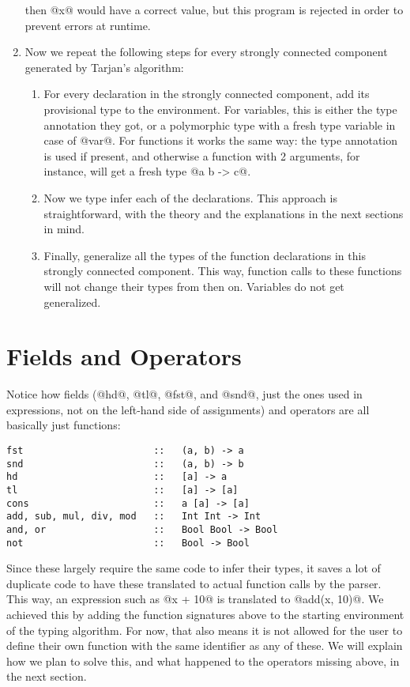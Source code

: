 \begin{enumerate}
    then @x@ would have a correct value, but this program is rejected in order to prevent errors at runtime.
    \item Now we repeat the following steps for every strongly connected component generated by Tarjan's algorithm:
    \begin{enumerate}
        \item For every declaration in the strongly connected component, add its provisional type to the environment. For variables, this is either the type annotation they got, or a polymorphic type with a fresh type variable in case of @var@. For functions it works the same way: the type annotation is used if present, and otherwise a function with 2 arguments, for instance, will get a fresh type @a b -> c@.
        \item Now we type infer each of the declarations. This approach is straightforward, with the theory and the explanations in the next sections in mind.
        \item Finally, generalize all the types of the function declarations in this strongly connected component. This way, function calls to these functions will not change their types from then on. Variables do not get generalized.
    \end{enumerate}
\end{enumerate}

\section{Fields and Operators}
Notice how fields (@hd@, @tl@, @fst@, and @snd@, just the ones used in expressions, not on the left-hand side of assignments) and operators are all basically just functions:
\begin{lstlisting}[language=spl]
fst                       ::   (a, b) -> a
snd                       ::   (a, b) -> b
hd                        ::   [a] -> a
tl                        ::   [a] -> [a]
cons                      ::   a [a] -> [a]
add, sub, mul, div, mod   ::   Int Int -> Int
and, or                   ::   Bool Bool -> Bool
not                       ::   Bool -> Bool
\end{lstlisting}
Since these largely require the same code to infer their types, it saves a lot of duplicate code to have these translated to actual function calls by the parser. This way, an expression such as @x + 10@ is translated to @add(x, 10)@. We achieved this by adding the function signatures above to the starting environment of the typing algorithm. For now, that also means it is not allowed for the user to define their own function with the same identifier as any of these. We will explain how we plan to solve this, and what happened to the operators missing above, in the next section.

